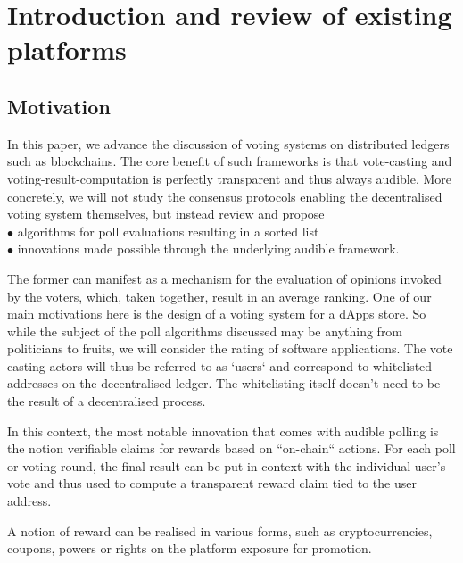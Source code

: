 
\section{Introduction and review of existing platforms}
\subsection{Motivation}
In this paper, we advance the discussion of voting systems on distributed ledgers such as blockchains. The core benefit of such frameworks is  that vote-casting and voting-result-computation is perfectly transparent and thus always audible.
More concretely, we will not study the consensus protocols enabling the decentralised voting system themselves, but instead review and propose\\
$\bullet$ algorithms for poll evaluations resulting in a sorted list\\
$\bullet$ innovations made possible through the underlying audible framework.

The former can manifest as a mechanism for the evaluation of opinions invoked by the voters, which, taken together, result in an average ranking. 
One of our main motivations here is the design of a voting system for a dApps store. So while the subject of the poll algorithms discussed may be anything from politicians to fruits, we will consider the rating of software applications. 
The vote casting actors will thus be referred to as `users` and correspond to whitelisted addresses on the decentralised ledger. 
The whitelisting itself doesn't need to be the result of a decentralised process. 

In this context, the most notable innovation that comes with audible polling is the notion verifiable claims for rewards based on ``on-chain`` actions. 
For each poll or voting round, the final result can be put in context with the individual user's vote and thus used to compute a transparent reward claim tied to the user address. 

A notion of reward can be realised in various forms, such as cryptocurrencies, coupons, powers or rights on the platform exposure for promotion.